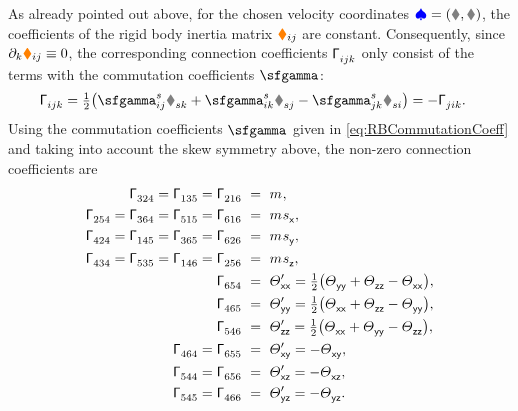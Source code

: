 As already pointed out above, for the chosen velocity coordinates $\sysVel = (\v,\w)$, the coefficients of the rigid body inertia matrix $\textcolor{orange}{\blacklozenge}_{ij}$ are constant.  
Consequently, since $\partial_{k}\textcolor{orange}{\blacklozenge}_{ij} \equiv 0$, the corresponding connection coefficients $\bodyConnCoeffL{}{}{\LidxI}{\LidxII}{\LidxIII}$ only consist of the terms with the commutation coefficients $\bodyBoltzSym{}{}{}$:
\begin{align}\label{eq:RBConnCoeff}
 \bodyConnCoeffL{}{}{\LidxI}{\LidxII}{\LidxIII} &= \tfrac{1}{2}\big(\bodyBoltzSym{\LidxV}{\LidxI}{\LidxII} \bodyInertiaMatCoeff{}{}{\LidxV\LidxIII} + \bodyBoltzSym{\LidxV}{\LidxI}{\LidxIII} \bodyInertiaMatCoeff{}{}{\LidxV\LidxII} - \bodyBoltzSym{\LidxV}{\LidxII}{\LidxIII} \bodyInertiaMatCoeff{}{}{\LidxV\LidxI} \big)
 = -\bodyConnCoeffL{}{}{\LidxII}{\LidxI}{\LidxIII}.
\end{align}
Using the commutation coefficients $\bodyBoltzSym{}{}{}$ given in \eqref{eq:RBCommutationCoeff} and taking into account the skew symmetry above, the non-zero connection coefficients are
\begin{subequations}\label{eq:RBConnCoeffRes}
\begin{align}
 \bodyConnCoeffL{}{}{3}{2}{4} = \bodyConnCoeffL{}{}{1}{3}{5} = \bodyConnCoeffL{}{}{2}{1}{6} \ &= \ \bodyMass{}{},
\\
 \bodyConnCoeffL{}{}{2}{5}{4} = \bodyConnCoeffL{}{}{3}{6}{4} = \bodyConnCoeffL{}{}{5}{1}{5} = \bodyConnCoeffL{}{}{6}{1}{6} \ &= \ \bodyMass{}{} \bodyCOMCoeff{}{}{\idxX},
\\
 \bodyConnCoeffL{}{}{4}{2}{4} = \bodyConnCoeffL{}{}{1}{4}{5} = \bodyConnCoeffL{}{}{3}{6}{5} = \bodyConnCoeffL{}{}{6}{2}{6} \ &= \ \bodyMass{}{} \bodyCOMCoeff{}{}{\idxY},
\\
 \bodyConnCoeffL{}{}{4}{3}{4} = \bodyConnCoeffL{}{}{5}{3}{5} = \bodyConnCoeffL{}{}{1}{4}{6} = \bodyConnCoeffL{}{}{2}{5}{6} \ &= \ \bodyMass{}{} \bodyCOMCoeff{}{}{\idxZ},
\\
 \bodyConnCoeffL{}{}{6}{5}{4} \ &= \ \bodyMOICoeffp{}{}{\idxX\idxX} = \tfrac{1}{2}\big( \bodyMOICoeff{}{}{\idxY\idxY} + \bodyMOICoeff{}{}{\idxZ\idxZ} - \bodyMOICoeff{}{}{\idxX\idxX} \big),
\\
 \bodyConnCoeffL{}{}{4}{6}{5} \ &= \ \bodyMOICoeffp{}{}{\idxY\idxY} = \tfrac{1}{2}\big( \bodyMOICoeff{}{}{\idxX\idxX} + \bodyMOICoeff{}{}{\idxZ\idxZ} - \bodyMOICoeff{}{}{\idxY\idxY} \big),
\\
 \bodyConnCoeffL{}{}{5}{4}{6} \ &= \ \bodyMOICoeffp{}{}{\idxZ\idxZ} = \tfrac{1}{2}\big( \bodyMOICoeff{}{}{\idxX\idxX} + \bodyMOICoeff{}{}{\idxY\idxY} - \bodyMOICoeff{}{}{\idxZ\idxZ} \big),
\\
 \bodyConnCoeffL{}{}{4}{6}{4} = \bodyConnCoeffL{}{}{6}{5}{5} \ &= \ \bodyMOICoeffp{}{}{\idxX\idxY} = -\bodyMOICoeff{}{}{\idxX\idxY},
\\
 \bodyConnCoeffL{}{}{5}{4}{4} = \bodyConnCoeffL{}{}{6}{5}{6} \ &= \ \bodyMOICoeffp{}{}{\idxX\idxZ} = -\bodyMOICoeff{}{}{\idxX\idxZ},
\\
 \bodyConnCoeffL{}{}{5}{4}{5} = \bodyConnCoeffL{}{}{4}{6}{6} \ &= \ \bodyMOICoeffp{}{}{\idxY\idxZ} = -\bodyMOICoeff{}{}{\idxY\idxZ}.
\end{align}
\end{subequations}
